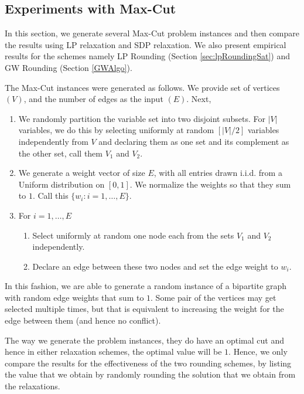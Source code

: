 \subsection{Experiments with Max-Cut}
In this section, we generate several Max-Cut problem instances and then compare the results using LP relaxation and SDP relaxation. We also present empirical results for the schemes namely LP Rounding (Section \ref{sec:lpRoundingSat}) and GW Rounding (Section \ref{GWAlgo}). 

The Max-Cut instances were generated as follows. We provide set of vertices $(V)$, and the number of edges as the input $(E)$. Next, 
\begin{enumerate}
	\item We randomly partition the variable set into two disjoint subsets. For $|V|$ variables, we do this by selecting uniformly at random $[|V|/2]$ variables independently from $V$ and declaring them as one set and its complement as the other set, call them $V_1$ and $V_2$. 
	\item We generate a weight vector of size $E$, with all entries drawn i.i.d. from a Uniform distribution on $[0, 1]$. We normalize the weights so that they sum to $1$. Call this $\{ w_i : i = 1, \ldots, E\}$.
	\item For $i=1, \ldots, E$ 
	\begin{enumerate}
		\item  Select uniformly at random one node each from the sets $V_1$ and $V_2$ independently. 
		\item Declare an edge between these two nodes and set the edge weight to $w_{i}$.
	\end{enumerate}
\end{enumerate}
In this fashion, we are able to generate a random instance of a bipartite graph with random edge weights that sum to $1$. Some pair of the vertices may get selected multiple times, but that is equivalent to increasing the weight for the edge between them (and hence no conflict).

The way we generate the problem instances, they do have an optimal cut and hence in either relaxation schemes, the optimal value will be $1$. Hence, we only compare the results for the effectiveness of the two rounding schemes, by listing the value that we obtain by randomly rounding the solution that we obtain from the relaxations. 

